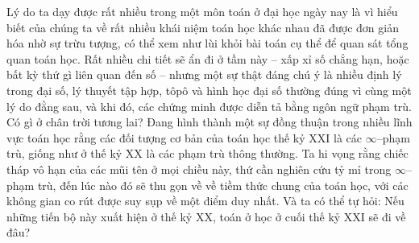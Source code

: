 \begin{multicols}{2}
	\vskip 0.1cm
	Lý do ta dạy được rất nhiều trong một môn toán ở đại học ngày nay là vì hiểu biết của chúng ta về rất nhiều khái niệm toán học khác nhau đã được đơn giản hóa nhờ sự trừu tượng, có thể xem như lùi khỏi bài toán cụ thể để quan sát tổng quan toán học. Rất nhiều chi tiết sẽ ẩn đi ở tầm này -- xấp xỉ số chẳng hạn, hoặc bất kỳ thứ gì liên quan đến số -- nhưng một sự thật đáng chú ý là nhiều định lý trong đại số, lý thuyết tập hợp, tôpô và hình học đại số thường đúng vì cùng một lý do đằng sau, và khi đó, các chứng minh được diễn tả bằng ngôn ngữ phạm trù.
	\vskip 0.1cm
	Có gì ở chân trời tương lai? Đang hình thành một sự đồng thuận trong nhiều lĩnh vực toán học rằng các đối tượng cơ bản của toán học thế kỷ XXI là các $\infty$--phạm trù, giống như ở thế kỷ XX là các phạm trù thông thường. Ta hi vọng rằng chiếc tháp vô hạn của các mũi tên ở mọi chiều này, thứ cần nghiên cứu tỷ mỉ trong $\infty$--phạm trù, đến lúc nào đó sẽ thu gọn về về tiềm thức chung của toán học, với các không gian co rút được suy sụp về một điểm duy nhất. Và ta có thể tự hỏi: Nếu những tiến bộ này xuất hiện ở thế kỷ XX, toán ở học ở cuối thế kỷ XXI sẽ đi về đâu?
\end{multicols}